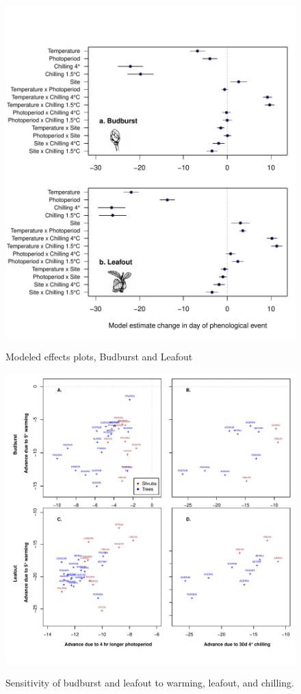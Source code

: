 \documentclass{article}
\begin{document}
\begin{figure}
\begin{center}
\caption{Modeled effects plots, Budburst and Leafout}
\includegraphics[scale=0.8]{Fig1_bb_lo}
\label{fig2}
\end{center}
\end{figure}


\begin{figure}
\caption{Sensitivity of budburst and leafout to warming, leafout, and chilling.}
\includegraphics[scale=0.9]{Fig2_4panel}
\label{fig3}
\end{figure}
\end{document}
